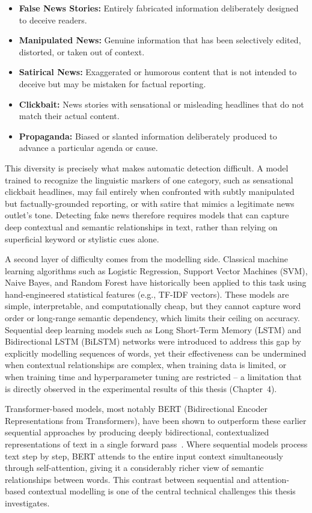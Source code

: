 \begin{itemize}
\item \textbf{False News Stories:} Entirely fabricated information deliberately designed to deceive readers.
\item \textbf{Manipulated News:} Genuine information that has been selectively edited, distorted, or taken out of context.
\item \textbf{Satirical News:} Exaggerated or humorous content that is not intended to deceive but may be mistaken for factual reporting.
\item \textbf{Clickbait:} News stories with sensational or misleading headlines that do not match their actual content.
\item \textbf{Propaganda:} Biased or slanted information deliberately produced to advance a particular agenda or cause.
\end{itemize}

This diversity is precisely what makes automatic detection difficult. A model trained to recognize the linguistic markers of one category, such as sensational clickbait headlines, may fail entirely when confronted with subtly manipulated but factually-grounded reporting, or with satire that mimics a legitimate news outlet's tone. Detecting fake news therefore requires models that can capture deep contextual and semantic relationships in text, rather than relying on superficial keyword or stylistic cues alone.

A second layer of difficulty comes from the modelling side. Classical machine learning algorithms such as Logistic Regression, Support Vector Machines (SVM), Naive Bayes, and Random Forest have historically been applied to this task using hand-engineered statistical features (e.g., TF-IDF vectors). These models are simple, interpretable, and computationally cheap, but they cannot capture word order or long-range semantic dependency, which limits their ceiling on accuracy. Sequential deep learning models such as Long Short-Term Memory (LSTM) and Bidirectional LSTM (BiLSTM) networks were introduced to address this gap by explicitly modelling sequences of words, yet their effectiveness can be undermined when contextual relationships are complex, when training data is limited, or when training time and hyperparameter tuning are restricted -- a limitation that is directly observed in the experimental results of this thesis (Chapter~4).

Transformer-based models, most notably BERT (Bidirectional Encoder Representations from Transformers), have been shown to outperform these earlier sequential approaches by producing deeply bidirectional, contextualized representations of text in a single forward pass~\citep{Kaliyar2021FakeBERT,Mehta2022RecentTrends}. Where sequential models process text step by step, BERT attends to the entire input context simultaneously through self-attention, giving it a considerably richer view of semantic relationships between words. This contrast between sequential and attention-based contextual modelling is one of the central technical challenges this thesis investigates.

